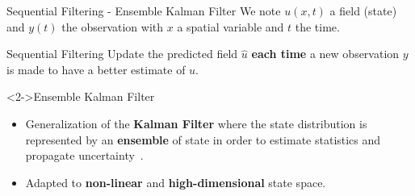 \documentclass[aspectratio=169]{beamer} %
\begin{document}
\begin{frame}{Sequential Filtering - Ensemble Kalman Filter}
    \small
    We note $u(x, t)$ a field (state) and $y(t)$ the observation with $x$ a spatial variable and $t$ the time.
    \begin{block}{Sequential Filtering}
        Update the predicted field $\hat u$ \textbf{each time} a new observation $y$ is made to have a better estimate of $u$.
    \end{block}
    \vfill
    \begin{block}<2->{Ensemble Kalman Filter}
        \begin{itemize}
            \item Generalization of the \textbf{Kalman Filter} where the state distribution is represented by an \textbf{ensemble} of state in order to estimate statistics and propagate uncertainty~\cite{evensen_sequential_1994}.
            \item Adapted to \textbf{non-linear} and \textbf{high-dimensional} state space.
        \end{itemize}
    \end{block}
\end{frame}
\end{document}
